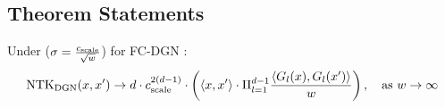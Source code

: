 

\subsection{Theorem Statements}
%

\begin{theorem}
\label{th:fc} Under   ($\sigma=\frac{c_{\text{scale}}}{\sqrt{w}}$) for FC-DGN : 
\begin{align*}
\text{NTK}_{\text{DGN}}(x,x') \rightarrow d \cdot c_{\text{scale}}^{2(d-1)} \cdot \left(\langle  x,x'\rangle \cdot \Pi_{l=1}^{d-1} \frac{\langle G_l(x),G_l(x')\rangle}w\right), \quad\text{as}\,\, w\rightarrow \infty 
\end{align*}
\end{theorem} 

